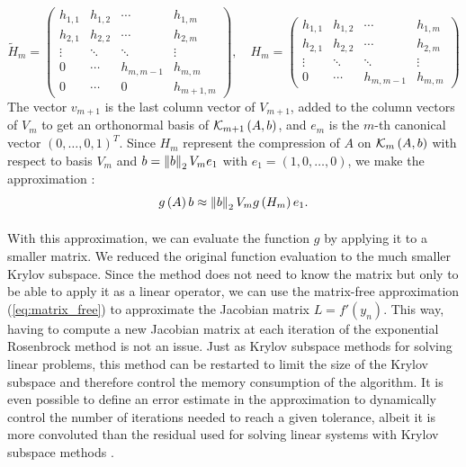       \begin{equation}
        \tilde{H}_m = \begin{pmatrix}
          h_{1,1} & h_{1,2} & \cdots    & h_{1,m} \\
          h_{2,1} & h_{2,2} & \cdots    & h_{2,m} \\
          \vdots  & \ddots  & \ddots    & \vdots  \\
          0       & \cdots  & h_{m,m-1} & h_{m,m} \\
          0       & \cdots  & 0         & h_{m+1,m}
        \end{pmatrix} , \quad H_m = \begin{pmatrix}
          h_{1,1} & h_{1,2} & \cdots    & h_{1,m} \\
          h_{2,1} & h_{2,2} & \cdots    & h_{2,m} \\
          \vdots  & \ddots  & \ddots    & \vdots  \\
          0       & \cdots  & h_{m,m-1} & h_{m,m}
        \end{pmatrix}
      \end{equation}
      The vector $v_{m+1}$ is the last column vector of $V_{m+1}$, added to the column vectors of $V_m$ to get an orthonormal basis of $\krylov[A, b]{m+1}$, and $e_m$ is the $m$-th canonical vector $\left(0, \dots, 0, 1\right)^T$.
      Since $H_m$ represent the compression of $A$ on $\krylov[A, b]{m}$ with respect to basis $V_m$ and $b = \norm[2]{b} V_m e_1$ with $e_1 = \left(1, 0, \dots, 0\right)$, we make the approximation \cite{EiermannErnst2006}:
      \begin{equation}
        g\left(A\right)b \approx \norm[2]{b} V_m g\left(H_m\right) e_1 .
      \end{equation}

      \paragraph{}
      With this approximation, we can evaluate the function $g$ by applying it to a smaller matrix.
      We reduced the original function evaluation to the much smaller Krylov subspace.
      Since the method does not need to know the matrix but only to be able to apply it as a linear operator, we can use the matrix-free approximation (\ref{eq:matrix_free}) to approximate the Jacobian matrix $L = f'\left(y_n\right)$.
      This way, having to compute a new Jacobian matrix at each iteration of the exponential Rosenbrock method is not an issue.
      Just as Krylov subspace methods for solving linear problems, this method can be restarted to limit the size of the Krylov subspace and therefore control the memory consumption of the algorithm.
      It is even possible to define an error estimate in the approximation to dynamically control the number of iterations needed to reach a given tolerance, albeit it is more convoluted than the residual used for solving linear systems with Krylov subspace methods \cite{EiermannErnst2006}.

